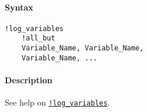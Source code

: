 


	\paragraph{Syntax}

\begin{verbatim}
!log_variables
    !all_but
    Variable_Name, Variable_Name, 
    Variable_Name, ...
\end{verbatim}

\paragraph{Description}

See help on \href{modellang/logvariables}{\texttt{!log\_variables}}.


